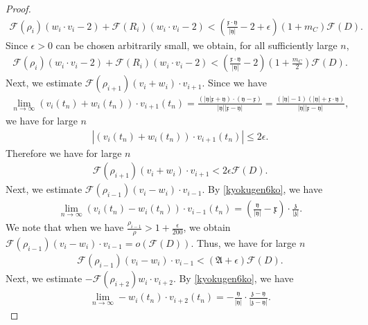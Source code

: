 \documentclass[reqno]{amsart}
\theoremstyle{plain}
\theoremstyle{definition}
\numberwithin{equation}{section}
\begin{document}
\begin{proof}
\begin{align*}
\mathcal{F}(\rho_i)(w_i\cdot v_i-2)+\mathcal{F}(R_i)(w_i\cdot v_i-2)<\left(\frac{\mathfrak{x}\cdot \mathfrak{y}}{|\mathfrak{y}|}-2+\epsilon\right)(1+m_C)\mathcal{F}(D).
\end{align*}
Since $\epsilon>0$ can be chosen arbitrarily small, we obtain, for all sufficiently large $n$,
\begin{align}\label{rhoiRies}
\mathcal{F}(\rho_i)(w_i\cdot v_i-2)+\mathcal{F}(R_i)(w_i\cdot v_i-2)<\left(\frac{\mathfrak{x}\cdot\mathfrak{y}}
{|\mathfrak{y}|}-2\right)\left(1+\frac{m_C}{2}\right)
\mathcal{F}(D).
\end{align}
Next, we estimate $\mathcal{F}(\rho_{i+1})(v_i+w_i)\cdot v_{i+1}$. Since we have
\begin{align*}
\lim_{n\to\infty} (v_i(t_n)+w_i(t_n))\cdot v_{i+1}(t_n)=\frac{\left(|\mathfrak{y}|\mathfrak{x}+\mathfrak{y}\right)\cdot \left(\mathfrak{y}-\mathfrak{x}\right)}{|\mathfrak{y}||\mathfrak{x}-\mathfrak{y}|}=\frac{\left(|\mathfrak{y}|-1\right)\left(|\mathfrak{y}|+\mathfrak{x}\cdot \mathfrak{y}\right)}{|\mathfrak{y}||\mathfrak{x}-\mathfrak{y}|},
\end{align*}
we have for large $n$
\begin{align*}
\left|(v_i(t_n)+w_i(t_n))\cdot v_{i+1}(t_n)\right|\leq 2\epsilon.
\end{align*}
Therefore we have for large $n$
\begin{align}\label{rhoi+1es}
\mathcal{F}(\rho_{i+1})(v_i+w_i)\cdot v_{i+1}<2\epsilon\mathcal{F}(D).
\end{align}
Next, we estimate $\mathcal{F}(\rho_{i-1})(v_i-w_i)\cdot v_{i-1}$. By \eqref{kyokugen6ko}, we have
\begin{align*}
\lim_{n\to\infty}(v_i(t_n)-w_i(t_n))\cdot v_{i-1}(t_n)=\left(\frac{\mathfrak{y}}{|\mathfrak{y}|}-\mathfrak{x}\right)\cdot \frac{\mathfrak{z}}{|\mathfrak{z}|}.
\end{align*}
We note that when we have $\frac{\rho_{i-1}}{\rho}>1+\frac{\epsilon}{200}$, we obtain $\mathcal{F}(\rho_{i-1})(v_i-w_i)\cdot v_{i-1}=o\left(\mathcal{F}(D)\right)$. Thus, we have for large $n$
\begin{align}\label{rhoi-1es}
\mathcal{F}(\rho_{i-1})(v_i-w_i)\cdot v_{i-1}< \left(\mathfrak{A}+\epsilon\right)\mathcal{F}(D).
\end{align}
Next, we estimate $ -\mathcal{F}(\rho_{i+2})w_i\cdot v_{i+2}$. By \eqref{kyokugen6ko}, we have
\begin{align*}
\lim_{n\to\infty}-w_i(t_n)\cdot v_{i+2}(t_n)=-\frac{\mathfrak{y}}{|\mathfrak{y}|}\cdot \frac{\mathfrak{z}-\mathfrak{y}}{|\mathfrak{z}-\mathfrak{y}|}.

\end{align*}
\end{proof}
\end{document}
